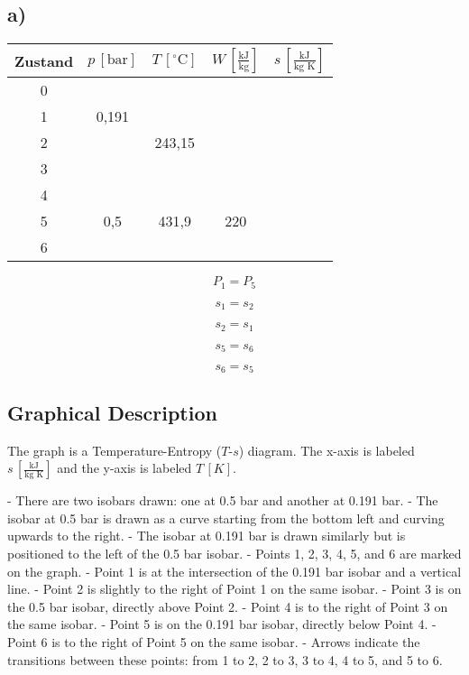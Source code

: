 

\subsection*{a)}

\begin{tabular}{c|c|c|c|c}
Zustand & $p \, [\text{bar}]$ & $T \, [^\circ \text{C}]$ & $W \, [\frac{\text{kJ}}{\text{kg}}]$ & $s \, [\frac{\text{kJ}}{\text{kg K}}]$ \\
\hline
0 & & & & \\
1 & 0,191 & & & \\
2 & & 243,15 & & \\
3 & & & & \\
4 & & & & \\
5 & 0,5 & 431,9 & 220 & \\
6 & & & & \\
\end{tabular}

\[
P_1 = P_5
\]

\[
s_1 = s_2
\]

\[
s_2 = s_1
\]

\[
s_5 = s_6
\]

\[
s_6 = s_5
\]

\subsection*{Graphical Description}

The graph is a Temperature-Entropy ($T$-$s$) diagram. The x-axis is labeled $s \, [\frac{\text{kJ}}{\text{kg K}}]$ and the y-axis is labeled $T \, [K]$. 

- There are two isobars drawn: one at 0.5 bar and another at 0.191 bar.
- The isobar at 0.5 bar is drawn as a curve starting from the bottom left and curving upwards to the right.
- The isobar at 0.191 bar is drawn similarly but is positioned to the left of the 0.5 bar isobar.
- Points 1, 2, 3, 4, 5, and 6 are marked on the graph.
- Point 1 is at the intersection of the 0.191 bar isobar and a vertical line.
- Point 2 is slightly to the right of Point 1 on the same isobar.
- Point 3 is on the 0.5 bar isobar, directly above Point 2.
- Point 4 is to the right of Point 3 on the same isobar.
- Point 5 is on the 0.191 bar isobar, directly below Point 4.
- Point 6 is to the right of Point 5 on the same isobar.
- Arrows indicate the transitions between these points: from 1 to 2, 2 to 3, 3 to 4, 4 to 5, and 5 to 6.